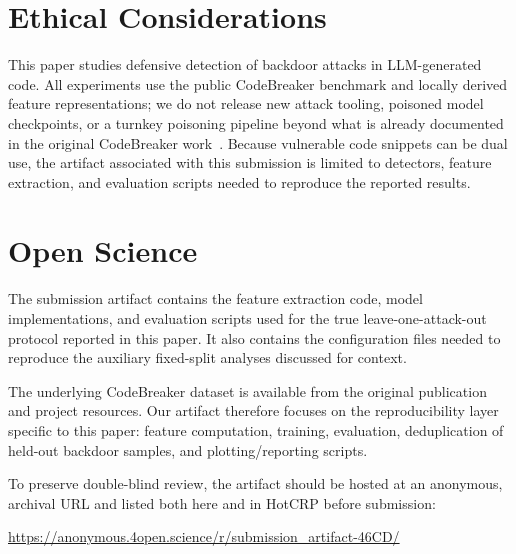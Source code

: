 ﻿\documentclass[sigconf,review,anonymous]{acmart}
\begin{document}
\appendix

\section{Ethical Considerations}
This paper studies defensive detection of backdoor attacks in LLM-generated
code. All experiments use the public CodeBreaker benchmark and locally derived
feature representations; we do not release new attack tooling, poisoned model
checkpoints, or a turnkey poisoning pipeline beyond what is already documented
in the original CodeBreaker work~\cite{codebreaker2023}. Because vulnerable
code snippets can be dual use, the artifact associated with this submission is
limited to detectors, feature extraction, and evaluation scripts needed to
reproduce the reported results.

\section{Open Science}
The submission artifact contains the feature extraction code, model
implementations, and evaluation scripts used for the true leave-one-attack-out
protocol reported in this paper. It also contains the configuration files needed
to reproduce the auxiliary fixed-split analyses discussed for context.

The underlying CodeBreaker dataset is available from the original publication
and project resources. Our artifact therefore focuses on the reproducibility
layer specific to this paper: feature computation, training, evaluation,
deduplication of held-out backdoor samples, and plotting/reporting scripts.

To preserve double-blind review, the artifact should be hosted at an anonymous,
archival URL and listed both here and in HotCRP before submission:
\begin{center}
\url{https://anonymous.4open.science/r/submission_artifact-46CD/}
\end{center}

\end{document}
